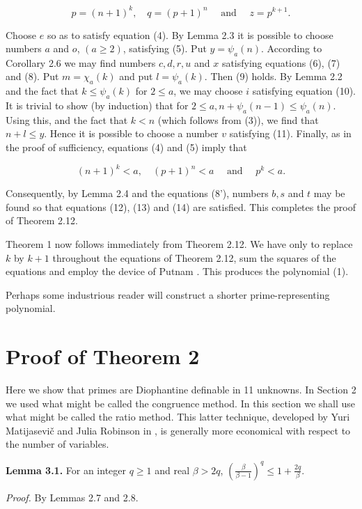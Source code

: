 \documentclass[10pt,letterpaper]{article}
\newcommand{\statement}[1]{\par\medskip\noindent\textbf{#1}\enspace}
\begin{document}
\begin{equation*}
p=(n+1)^{k}, \quad q=(p+1)^{n} \quad \text { and } \quad z=p^{k+1} . \tag{8'}
\end{equation*}


Choose $e$ so as to satisfy equation (4). By Lemma 2.3 it is possible to choose numbers $a$ and $o$, $(a \geq 2)$, satisfying (5). Put $y=\psi_{a}(n)$. According to Corollary 2.6 we may find numbers $c, d, r, u$ and $x$ satisfying equations (6), (7) and (8). Put $m=\chi_{a}(k)$ and put $l=\psi_{a}(k)$. Then (9) holds. By Lemma 2.2 and the fact that $k \leq \psi_{a}(k)$ for $2 \leq a$, we may choose $i$ satisfying equation (10). It is trivial to show (by induction) that for $2 \leq a, n+\psi_{a}(n-1) \leq \psi_{a}(n)$. Using this, and the fact that $k<n$ (which follows from (3)), we find that $n+l \leq y$. Hence it is possible to choose a number $v$ satisfying (11). Finally, as in the proof of sufficiency, equations (4) and (5) imply that

\[
(n+1)^{k}<a, \quad(p+1)^{n}<a \quad \text { and } \quad p^{k}<a .
\]

Consequently, by Lemma 2.4 and the equations (8'), numbers $b, s$ and $t$ may be found so that equations (12), (13) and (14) are satisfied. This completes the proof of Theorem 2.12.

Theorem 1 now follows immediately from Theorem 2.12. We have only to replace $k$ by $k+1$ throughout the equations of Theorem 2.12, sum the squares of the equations and employ the device of Putnam \cite{ref12}. This produces the polynomial (1).

Perhaps some industrious reader will construct a shorter prime-representing polynomial.


\section{Proof of Theorem 2} Here we show that primes are Diophantine definable in 11 unknowns. In Section 2 we used what might be called the congruence method. In this section we shall use what might be called the ratio method. This latter technique, developed by Yuri Matijasevič and Julia Robinson in \cite{ref11}, is generally more economical with respect to the number of variables.

\statement{Lemma 3.1.} For an integer $q\geq1$ and real $\beta>2q$, $\left(\frac{\beta}{\beta-1}\right)^{q} \leq 1+\frac{2 q}{\beta}$.

\textit{Proof.} By Lemmas 2.7 and 2.8.
\end{document}
